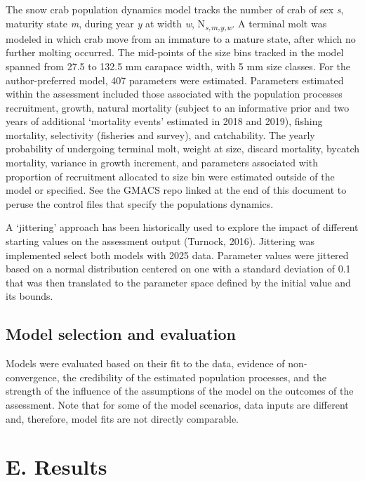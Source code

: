 \documentclass[
]{article}
\begin{document}
The snow crab population dynamics model tracks the number of crab of sex \emph{s}, maturity state \emph{m}, during year \emph{y} at width \emph{w}, N\textsubscript{\emph{s,m,y,w}}. A terminal molt was modeled in which crab move from an immature to a mature state, after which no further molting occurred. The mid-points of the size bins tracked in the model spanned from 27.5 to 132.5 mm carapace width, with 5 mm size classes. For the author-preferred model, 407 parameters were estimated. Parameters estimated within the assessment included those associated with the population processes recruitment, growth, natural mortality (subject to an informative prior and two years of additional `mortality events' estimated in 2018 and 2019), fishing mortality, selectivity (fisheries and survey), and catchability. The yearly probability of undergoing terminal molt, weight at size, discard mortality, bycatch mortality, variance in growth increment, and parameters associated with proportion of recruitment allocated to size bin were estimated outside of the model or specified. See the GMACS repo linked at the end of this document to peruse the control files that specify the populations dynamics.

A `jittering' approach has been historically used to explore the impact of different starting values on the assessment output (Turnock, 2016). Jittering was implemented select both models with 2025 data. Parameter values were jittered based on a normal distribution centered on one with a standard deviation of 0.1 that was then translated to the parameter space defined by the initial value and its bounds.

\subsection{Model selection and evaluation}\label{model-selection-and-evaluation}

Models were evaluated based on their fit to the data, evidence of non-convergence, the credibility of the estimated population processes, and the strength of the influence of the assumptions of the model on the outcomes of the assessment. Note that for some of the model scenarios, data inputs are different and, therefore, model fits are not directly comparable.

\section{E. Results}\label{e.-results}
\end{document}
